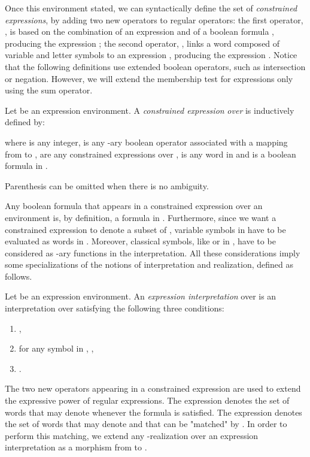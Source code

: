 \documentclass[a4paper]{llncs}
\begin{document}
  Once this environment stated, we can syntactically define the set of \emph{constrained expressions}, by adding two new operators to regular operators: the first operator, , is based on the combination of an expression  and of a boolean formula , producing the expression ; the second operator, , links a word  composed of variable and letter symbols to an expression , producing the expression .
  Notice that the following definitions use extended boolean operators, such as intersection or negation. However, we will extend the membership test for expressions only using the sum operator.
  
    
  \begin{definition}
    Let  be an expression environment. A \emph{constrained expression}  \emph{over}  is inductively defined by:
    
    where  is any integer,  is any -ary boolean operator associated with a mapping from  to ,  are any  constrained expressions over ,  is any word in  and  is a boolean formula in .
  \end{definition}  
\noindent  
  Parenthesis can be omitted when there is no ambiguity.
  
  Any boolean formula that appears in a constrained expression over an environment  is, by definition, a formula in . Furthermore, since we want a constrained expression to denote  a subset of , variable symbols in  have to be evaluated as words in . Moreover, classical symbols, like  or  in , have to be considered as -ary functions in the interpretation. All these considerations imply some specializations of the notions of
interpretation and realization, defined as follows.
  
  \begin{definition}
    Let  be an expression environment. An \emph{expression interpretation}  over  is an interpretation  over  satisfying the following three conditions:
    \begin{enumerate}
      \item ,
      \item for any symbol  in , , 
      \item .
    \end{enumerate}
  \end{definition} 
  
  The two new operators appearing in a constrained expression are used to extend the expressive power of regular expressions. The expression  denotes the set of words that  may denote whenever the formula  is satisfied. The expression  denotes the set of words that  may denote and that can be "matched" by . In order to perform this matching, we extend any -realization over an expression interpretation as a morphism from  to . 
\end{document}
